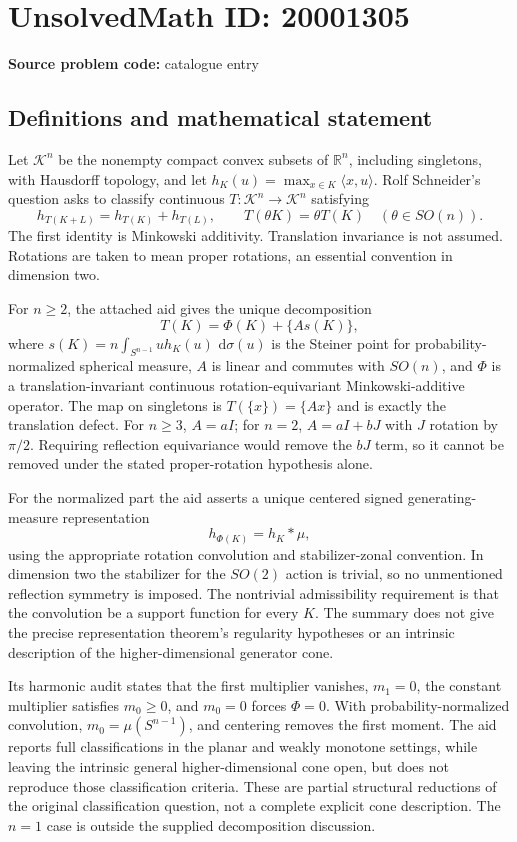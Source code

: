 \documentclass[11pt]{article}
\newcommand{\R}{\mathbb{R}}
\newcommand{\dd}{\,\mathrm{d}}
\begin{document}
\section*{UnsolvedMath ID: 20001305}
\textbf{Source problem code:} catalogue entry
\subsection{Definitions and mathematical statement}
Let $\mathcal K^n$ be the nonempty compact convex subsets of $\R^n$, including singletons, with Hausdorff topology, and let $h_K(u)=\max_{x\in K}\langle x,u\rangle$. Rolf Schneider's question asks to classify continuous $T:\mathcal K^n\to\mathcal K^n$ satisfying
\[
h_{T(K+L)}=h_{T(K)}+h_{T(L)},\qquad T(\theta K)=\theta T(K)\quad(\theta\in SO(n)).
\]
The first identity is Minkowski additivity. Translation invariance is not assumed. Rotations are taken to mean proper rotations, an essential convention in dimension two.

For $n\ge2$, the attached aid gives the unique decomposition
\[
T(K)=\Phi(K)+\{A s(K)\},
\]
where $s(K)=n\int_{S^{n-1}}u h_K(u)\,\dd\sigma(u)$ is the Steiner point for probability-normalized spherical measure, $A$ is linear and commutes with $SO(n)$, and $\Phi$ is a translation-invariant continuous rotation-equivariant Minkowski-additive operator. The map on singletons is $T(\{x\})=\{Ax\}$ and is exactly the translation defect. For $n\ge3$, $A=aI$; for $n=2$, $A=aI+bJ$ with $J$ rotation by $\pi/2$. Requiring reflection equivariance would remove the $bJ$ term, so it cannot be removed under the stated proper-rotation hypothesis alone.

For the normalized part the aid asserts a unique centered signed generating-measure representation
\[
h_{\Phi(K)}=h_K*\mu,
\]
using the appropriate rotation convolution and stabilizer-zonal convention. In dimension two the stabilizer for the $SO(2)$ action is trivial, so no unmentioned reflection symmetry is imposed. The nontrivial admissibility requirement is that the convolution be a support function for every $K$. The summary does not give the precise representation theorem's regularity hypotheses or an intrinsic description of the higher-dimensional generator cone.

Its harmonic audit states that the first multiplier vanishes, $m_1=0$, the constant multiplier satisfies $m_0\ge0$, and $m_0=0$ forces $\Phi=0$. With probability-normalized convolution, $m_0=\mu(S^{n-1})$, and centering removes the first moment. The aid reports full classifications in the planar and weakly monotone settings, while leaving the intrinsic general higher-dimensional cone open, but does not reproduce those classification criteria. These are partial structural reductions of the original classification question, not a complete explicit cone description. The $n=1$ case is outside the supplied decomposition discussion.
\end{document}

